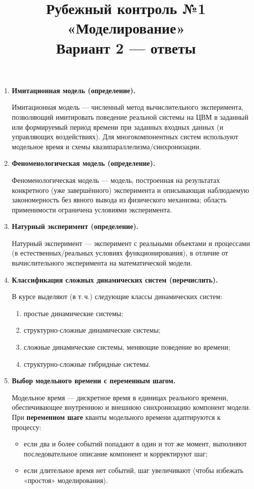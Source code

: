 \documentclass[12pt,a4paper]{article}
\title{Рубежный контроль №1 «Моделирование»\\Вариант 2 — ответы}
\author{}
\date{}
\begin{document}
\maketitle

\begin{enumerate}[label=\textbf{\arabic*.}]

\item \textbf{Имитационная модель (определение).}

Имитационная модель — численный метод вычислительного эксперимента, позволяющий имитировать поведение реальной системы на ЦВМ в заданный или формируемый период времени при заданных входных данных (и управляющих воздействиях). Для многокомпонентных систем используют модельное время и схемы квазипараллелизма/синхронизации.

\item \textbf{Феноменологическая модель (определение).}

Феноменологическая модель — модель, построенная на результатах конкретного (уже завершённого) эксперимента и описывающая наблюдаемую закономерность без явного вывода из физического механизма; область применимости ограничена условиями эксперимента.

\item \textbf{Натурный эксперимент (определение).}

Натурный эксперимент — эксперимент с реальными объектами и процессами (в естественных/реальных условиях функционирования), в отличие от вычислительного эксперимента на математической модели.

\item \textbf{Классификация сложных динамических систем (перечислить).}

В курсе выделяют (в т.\,ч.) следующие классы динамических систем:
\begin{enumerate}[label=\arabic*)]
\item простые динамические системы;
\item структурно-сложные динамические системы;
\item сложные динамические системы, меняющие поведение во времени;
\item структурно-сложные гибридные системы.
\end{enumerate}

\item \textbf{Выбор модельного времени с переменным шагом.}

Модельное время — дискретное время в единицах реального времени, обеспечивающее внутреннюю и внешнюю синхронизацию компонент модели.
При \textbf{переменном шаге} кванты модельного времени адаптируются к процессу:
\begin{itemize}
\item если два и более событий попадают в один и тот же момент, выполняют последовательное описание компонент и корректируют шаг;
\item если длительное время нет событий, шаг увеличивают (чтобы избежать «простоя» моделирования).
\end{itemize}


\end{enumerate}
\end{document}
